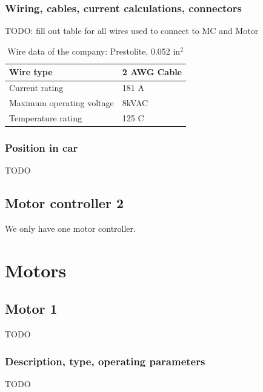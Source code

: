 \documentclass{article}
\begin{document}
\subsubsection{Wiring, cables, current calculations, connectors}
TODO: fill out table for all wires used to connect to MC and Motor 

\begin{table}[H]
	\centering
	\begin{tabular}{|l|l|}
	\hline
	Wire type & 2 AWG Cable\\ \hline
	Current rating & 181 A \\ \hline
	Maximum operating voltage & 8kVAC \\ \hline
	Temperature rating & 125 \degree C \\ \hline
	\end{tabular}
	\caption{Wire data of the company: Prestolite, 0.052 in$^{2}$}
	\label{motortomcwire}
\end{table}

\subsubsection{Position in car}
TODO

\subsection{Motor controller 2}
We only have one motor controller.

\section{Motors}
\subsection{Motor 1}
TODO

\subsubsection{Description, type, operating parameters}
TODO
\end{document}
